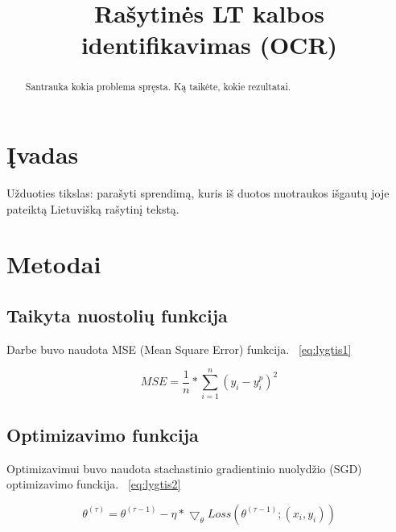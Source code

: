 \documentclass[conference]{IEEEtran}
\begin{document}
\title{Rašytinės LT kalbos identifikavimas (OCR)}

\author{
}

\maketitle

\begin{abstract}
Santrauka kokia problema spręsta. Ką taikėte, kokie rezultatai.
\end{abstract}

\section{Įvadas}
Užduoties tikslas: parašyti sprendimą, kuris iš duotos
nuotraukos išgautų joje pateiktą Lietuvišką rašytinį tekstą.

\section{Metodai}

\subsection{Taikyta nuostolių funkcija}

Darbe buvo naudota MSE (Mean Square Error) funkcija. ~\eqref{eq:lygtis1}

\begin{equation}
MSE = \frac{1}{n} * \sum_{i=1}^{n} (y_{i} - y_{i}^{p})^{2}
\label{eq:lygtis1}
\end{equation}

\subsection{Optimizavimo funkcija}

Optimizavimui buvo naudota stachastinio gradientinio nuolydžio
(SGD) optimizavimo funckija. ~\eqref{eq:lygtis2}

\begin{equation}
\theta^{(\tau)} = \theta^{(\tau - 1)} - \eta * \bigtriangledown_{\theta} Loss(\theta^{(\tau - 1)};(x_{i}, y_{i}))
\label{eq:lygtis2}
\end{equation}
\end{document}

